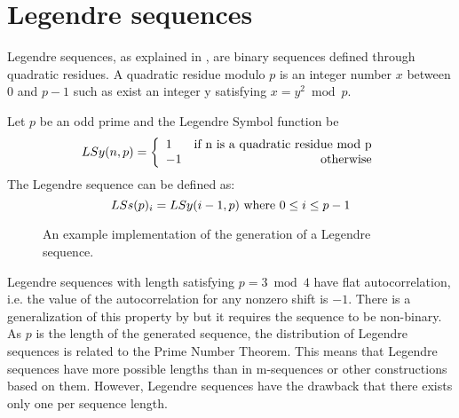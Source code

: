 \section{Legendre sequences}

Legendre sequences, as explained in \citet{legendre_sequences}, are binary
sequences defined through quadratic residues. A quadratic residue modulo $p$ is an integer number $x$ between $0$ and $p-1$ such as exist an integer y satisfying $x=y^2 \bmod p$.

\begin{definition}
  Let $p$ be an odd prime and the  Legendre Symbol function  be
    \begin{equation}
      LSy(n, p) = \left\{\begin{array}{lr}
          1  & \textnormal{if n is a quadratic residue mod p}   \\
          -1 & \textnormal{otherwise} \\
      \end{array}\right.
    \end{equation}
  The Legendre sequence can be defined as:
    \begin{equation}
      LSs(p)_{i} = LSy(i-1, p) \textnormal{  where  } 0 \leq i \leq p-1
    \end{equation}
\end{definition}

\begin{figure}[ht!]
  \caption{An example implementation of the generation of a Legendre sequence.}
  \label{}
\end{figure}
 Legendre sequences with length  satisfying $p=3\bmod 4$ have flat autocorrelation, i.e. 
 the value of the autocorrelation for any nonzero shift is $-1$. There is a generalization of this property by \citet{legendre_sequences}  but it requires the sequence 
 to be non-binary.\\ 

As $p$ is the length of the generated sequence, the distribution of Legendre sequences is related to the Prime Number Theorem. This means that Legendre sequences have more possible lengths than in m-sequences or other constructions based on them. However, Legendre sequences have the drawback that there exists only one per sequence length.
